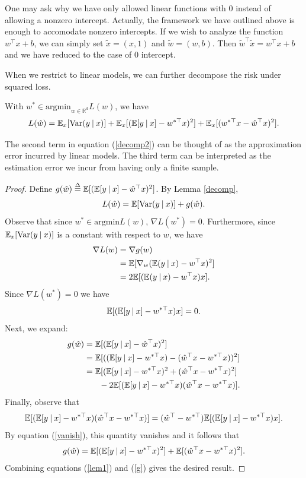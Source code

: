 \documentclass[]{subook}
\begin{document}
One may ask why we have only allowed linear functions with $0$ instead of allowing a nonzero intercept. Actually, the framework we have outlined above is enough to accomodate nonzero intercepts. If we wish to analyze the function $w^\top x + b$, we can simply set $\tilde{x} = (x,1)$ and $\tilde{w} = (w,b)$. Then $\tilde{w}^\top \tilde{x} = w^\top x + b$ and we have reduced to the case of $0$ intercept.

When we restrict to linear models, we can further decompose the risk under squared loss.
\begin{lemma} \label{lin}
With $w^*\in \mathrm{argmin}_{w\in \mathbb{R}^d}L(w)$, we have \begin{equation}\label{decomp2}L(\hat{w}) = \mathbb{E}_x [\mathrm{Var}(y \: | \: x)] + \mathbb{E}_x[(\mathbb{E}[y\: | \: x]-w^{*\top} x)^2] + \mathbb{E}_x[(w^{*\top} x-\hat{w}^\top x)^2].\end{equation}
\end{lemma}
The second term in equation (\ref{decomp2}) can be thought of as the approximation error incurred by linear models. The third term can be interpreted as the estimation error we incur from having only a finite sample.
\begin{proof}
Define $g(\hat{w}) \defn \E[(\E[y\: | \: x]-\hat{w}^\top x)^2]$. By Lemma \ref{decomp}, \begin{equation}\label{lem1}L(\hat{w}) = \mathbb{E}[\mathrm{Var}(y\: | \: x)] + g(\hat{w}).\end{equation} Observe that since $w^*\in \mathrm{argmin} L(w)$, $\nabla L(w^*)=0$. Furthermore, since $\mathbb{E}_x[\mathrm{Var}(y\: | \: x)]$ is a constant with respect to $w$, we have
\begin{align*}
    \nabla L(w) &= \nabla g(w) \\
    &= \mathbb{E}[\nabla_w(\mathbb{E}(y\: | \: x) -w^\top x)^2] \\
    &= 2\mathbb{E}[(\mathbb{E}(y\: | \: x) - w^\top x)x].
\end{align*}
Since $\nabla L(w^*)=0$ we have \begin{equation}\label{vanish}\mathbb{E}[(\mathbb{E}[y \: | \: x]-w^{*\top}x)x]=0.\end{equation} Next, we expand:
\begin{align*}
    g(\hat{w}) &= \mathbb{E}[(\mathbb{E}[y\: | \: x]-\hat{w}^\top x)^2] \\
    &= \mathbb{E}[((\mathbb{E}[y\: | \:x]-w^{*\top}x)-(\hat{w}^\top x-w^{*\top}x))^2] \\
    &=\mathbb{E}[(\mathbb{E}[y\: | \: x] - w^{*\top}x)^2 + (\hat{w}^\top x - w^{*\top}x)^2] \\
    &\hspace{.25in} -2\mathbb{E}[(\mathbb{E}[y \: | \: x] - w^{*\top}x)(\hat{w}^\top x-w^{*\top}x)].
\end{align*}
Finally, observe that $$\mathbb{E}[(\mathbb{E}[y\: | \:x] - w^{*\top}x)(\hat{w}^\top x - w^{*\top}x)] = (\hat{w}^\top - w^{*\top})\mathbb{E}[(\mathbb{E}[y\:|\:x]-w^{*\top}x)x].$$ By equation (\ref{vanish}), this quantity vanishes and it follows that
\begin{equation}\label{g}g(\hat{w}) = \mathbb{E}[(\mathbb{E}[y\: | \: x] - w^{*\top}x)^2] + \mathbb{E}[(\hat{w}^\top x - w^{*\top}x)^2].\end{equation} Combining equations (\ref{lem1}) and (\ref{g}) gives the desired result. 
\end{proof}
\end{document}
